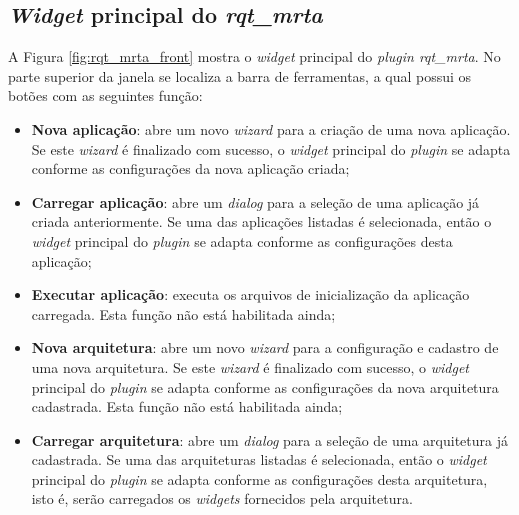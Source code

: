         \subsection{\textit{Widget} principal do \textit{rqt\_mrta}} \label{subsec:rqt_mrta_front}
            A Figura \ref{fig:rqt_mrta_front} mostra o \textit{widget} principal do \textit{plugin rqt\_mrta}. No parte superior da janela se localiza a barra de ferramentas, a qual possui os botões com as seguintes função:
            
            \begin{itemize}
                \item \textbf{Nova aplicação}: abre um novo \textit{wizard} para a criação de uma nova aplicação. Se este \textit{wizard} é finalizado com sucesso, o \textit{widget} principal do \textit{plugin} se adapta conforme as configurações da nova aplicação criada;
                
                \item \textbf{Carregar aplicação}: abre um \textit{dialog} para a seleção de uma aplicação já criada anteriormente. Se uma das aplicações listadas é selecionada, então o \textit{widget} principal do \textit{plugin} se adapta conforme as configurações desta aplicação;
                
                \item \textbf{Executar aplicação}: executa os arquivos de inicialização da aplicação carregada. Esta função não está habilitada ainda;
                
                \item \textbf{Nova arquitetura}: abre um novo \textit{wizard} para a configuração e cadastro de uma nova arquitetura. Se este \textit{wizard} é finalizado com sucesso, o \textit{widget} principal do \textit{plugin} se adapta conforme as configurações da nova arquitetura cadastrada. Esta função não está habilitada ainda;
                
                \item \textbf{Carregar arquitetura}: abre um \textit{dialog} para a seleção de uma arquitetura já cadastrada. Se uma das arquiteturas listadas é selecionada, então o \textit{widget} principal do \textit{plugin} se adapta conforme as configurações desta arquitetura, isto é, serão carregados os \textit{widgets} fornecidos pela arquitetura.
            \end{itemize}
        
